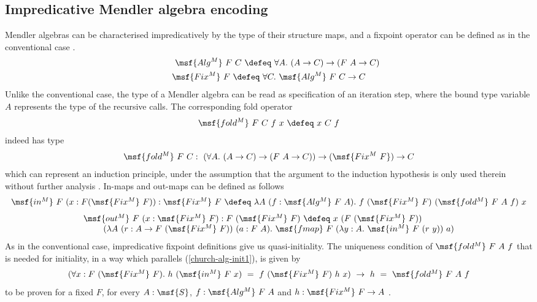 \documentclass[submission,copyright,creativecommons]{eptcs}
\begin{document}
\subsection{Impredicative Mendler algebra encoding}

Mendler algebras can be characterised impredicatively by the type of
their structure maps, and a fixpoint operator can be defined as in the
conventional case \cite{Mendler91,Dela13}.
\begin{gather} \qquad \msf{Alg^M} \ F \ C \ \defeq \ \forall A. \ (A \to C) \to (F \ A \to
C) \\
\msf{Fix^M} \ F \ \defeq \ \forall C. \ \msf{Alg^M} \ F \ C \to C \end{gather} 
Unlike the conventional case, the type of a Mendler algebra can be
read as specification of an iteration step, where the bound type
variable $A$ represents the type of the recursive calls.  The
corresponding fold operator
\begin{gather} \msf{fold^M} \ F \ C \ f \ x \ \defeq \ x \ C \ f \end{gather} 
indeed has type
\begin{gather}  \msf{fold^M} \ F \ C : \ (\forall A. \ (A \to C) \to (F \ A \to C))
\to (\msf{Fix^M \ F}) \to C \end{gather}
which can represent an induction principle, under the assumption that
the argument to the induction hypothesis is only used therein without
further analysis \cite{Mendler91,AbelMU05}. In-maps and out-maps can
be defined as follows
\begin{gather} 
\begin{array}{lll}
\msf{in^M} \ F \ (x: F (\msf{Fix^M} \ F)): \msf{Fix^M} \ F \ \defeq \ 
\lambda  A \ (f: \msf{Alg^M} \ F \ A). \ f
\ (\msf{Fix^M} \ F) \ (\msf{fold^M} \ F \ A \ f) \ x
\end{array}
 \end{gather} 
\begin{gather} 
\begin{array}{lll}
 \msf{out^M} \ F \ (x: \msf{Fix^M} \ F) : F \ (\msf{Fix^M} \ F)
 \ \defeq \ x \ (F \ (\msf{Fix^M} \ F)) \\ \qquad \ (\lambda  A \ (r: A
 \to F \ (\msf{Fix^M} \ F)) \ (a: F \ A). 
\ \msf{fmap} \ F \ (\lambda y:A. \ \msf{in^M} \ F \ (r \ y)) \ a)
\end{array}
 \end{gather} 
As in the conventional case, impredicative fixpoint definitions give
us quasi-initiality. The uniqueness condition of $\msf{fold^M} \ F \ A
\ f$ that is needed for initiality, in a way which parallels
(\ref{church-alg-init1}), is given by
\begin{gather}  \label{mendler-alg-init1}
\begin{array}{lll}
(\forall x: F \ (\msf{Fix^M} \ F). \ h \ (\msf{in^M} \ F \ x) \ = \ f
  \ (\msf{Fix^M} \ F) \ h \ x) \ \to \ 
h \ = \ \msf{fold^M} \ F \ A \ f
\end{array}
 \end{gather} 
to be proven for a fixed $F$, for every $A: \msf{S}$, $f:\msf{Alg^M}
\ F \ A$ and $h: \msf{Fix^M} \ F \to A$ \cite{UustaluV99}.
\end{document}
